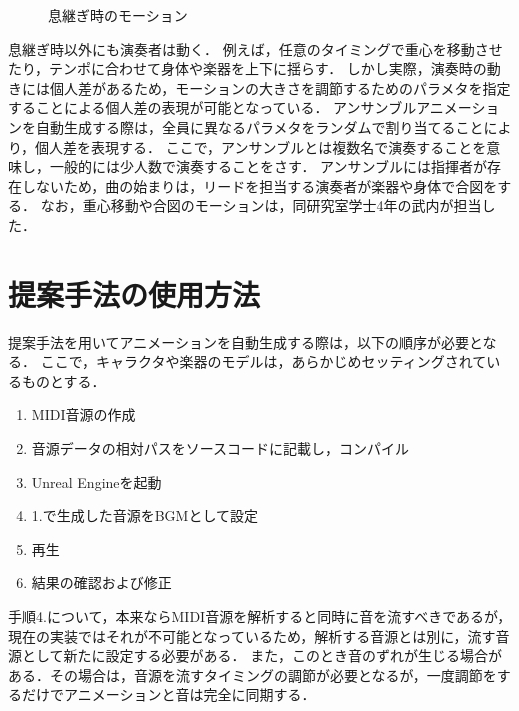\begin{figure}[!h]
	\caption{息継ぎ時のモーション}
	\label{fig:breath_motion}
\vspace{10mm}
\end{figure}
\newpage
\indent
息継ぎ時以外にも演奏者は動く．
例えば，任意のタイミングで重心を移動させたり，テンポに合わせて身体や楽器を上下に揺らす．
しかし実際，演奏時の動きには個人差があるため，モーションの大きさを調節するためのパラメタを指定することによる個人差の表現が可能となっている．
アンサンブルアニメーションを自動生成する際は，全員に異なるパラメタをランダムで割り当てることにより，個人差を表現する．
ここで，アンサンブルとは複数名で演奏することを意味し，一般的には少人数で演奏することをさす．
アンサンブルには指揮者が存在しないため，曲の始まりは，リードを担当する演奏者が楽器や身体で合図をする．
なお，重心移動や合図のモーションは，同研究室学士4年の武内が担当した．

\section{提案手法の使用方法} \label{sec:howto}
提案手法を用いてアニメーションを自動生成する際は，以下の順序が必要となる．
ここで，キャラクタや楽器のモデルは，あらかじめセッティングされているものとする．
\begin{enumerate}
	\item MIDI音源の作成
	\item 音源データの相対パスをソースコードに記載し，コンパイル
	\item Unreal Engineを起動
	\item 1.で生成した音源をBGMとして設定
	\item 再生
	\item 結果の確認および修正
\end{enumerate}\par
手順4.について，本来ならMIDI音源を解析すると同時に音を流すべきであるが，現在の実装ではそれが不可能となっているため，解析する音源とは別に，流す音源として新たに設定する必要がある．
また，このとき音のずれが生じる場合がある．その場合は，音源を流すタイミングの調節が必要となるが，一度調節をするだけでアニメーションと音は完全に同期する．